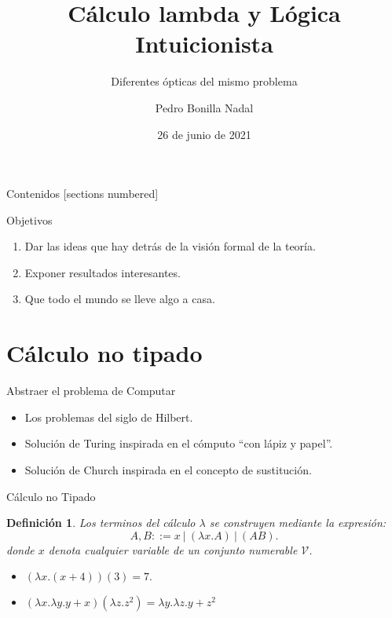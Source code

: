 \documentclass[usenames,dvipsnames]{beamer}
\title{Cálculo lambda y Lógica Intuicionista}
\subtitle{Diferentes ópticas del mismo problema}
\date{26 de junio de 2021}
\institute{EsLibre 2021}
\author{Pedro Bonilla Nadal}
\newtheorem{definicion}{Definición}
\begin{document}
\maketitle
\begin{frame}{Contenidos}
  [sections numbered]
  \tableofcontents [hideallsubsections]
\end{frame}
\begin{frame}{Objetivos}
  \begin{enumerate}
  \item Dar las ideas que hay detrás de la visión formal de la teoría.
  \item Exponer resultados interesantes.
  \item Que todo el mundo se lleve algo a casa.
  \end{enumerate}
\end{frame}
\section{Cálculo no tipado}
\begin{frame}{Abstraer el problema de Computar}
  \begin{itemize}
  \item Los problemas del siglo de Hilbert.
  \item Solución de Turing inspirada en el cómputo ``con lápiz y papel''.
  \item Solución de Church inspirada en el concepto de sustitución.
  \end{itemize}
\end{frame}

\begin{frame}{Cálculo no Tipado}
  \begin{definicion}
    Los terminos del cálculo $\lambda$ se construyen mediante la expresión:
    $$A,B ::= x\ |\ (\lambda x.A)\ |\ (AB) .$$
    donde $x$ denota cualquier variable de un conjunto numerable $\mathcal{V}$.
  \end{definicion}
  \begin{example}
    \begin{itemize}
    \item $(\lambda x.(x+4)) (3) = 7.$
    \item $(\lambda x.\lambda y. y+x)(\lambda z. z^2) = \lambda y. \lambda z. y+z^2 $
    \end{itemize}
  \end{example}
\end{frame}
\end{document}
